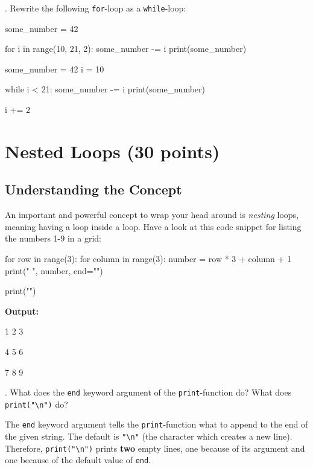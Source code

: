 . Rewrite the following \texttt{for}-loop as a \texttt{while}-loop:

\begin{pythoncode}
some_number = 42

for i in range(10, 21, 2):
    some_number -= i
    print(some_number)
\end{pythoncode}

\begin{solution}
    \begin{pythoncode}
some_number = 42
i = 10

while i < 21:
    some_number -= i
    print(some_number)

    i += 2
    \end{pythoncode}
\end{solution}


\section{Nested Loops (30 points)}

\subsection{Understanding the Concept}

An important and powerful concept to wrap your head around is \textit{nesting} loops, meaning having a loop inside a loop. Have a look at this code snippet for listing the numbers 1-9 in a grid:

\begin{pythoncode}
for row in range(3):
    for column in range(3):
        number = row * 3 + column + 1
        print("  ", number, end="")

    print("\n")
\end{pythoncode}

\noindent \textbf{Output:}

\begin{outputcode}
    1   2   3

    4   5   6

    7   8   9
\end{outputcode}

. What does the \texttt{end} keyword argument of the \texttt{print}-function do? What does \texttt{print("\textbackslash n")} do?

\vspace{1em}

\begin{solution}
    The \texttt{end} keyword argument tells the \texttt{print}-function what to append to the end of the given string. The default is \texttt{"\textbackslash n"} (the character which creates a new line). Therefore, \texttt{print("\textbackslash n")} prints \textbf{two} empty lines, one because of its argument and one because of the default value of \texttt{end}.
\end{solution}

